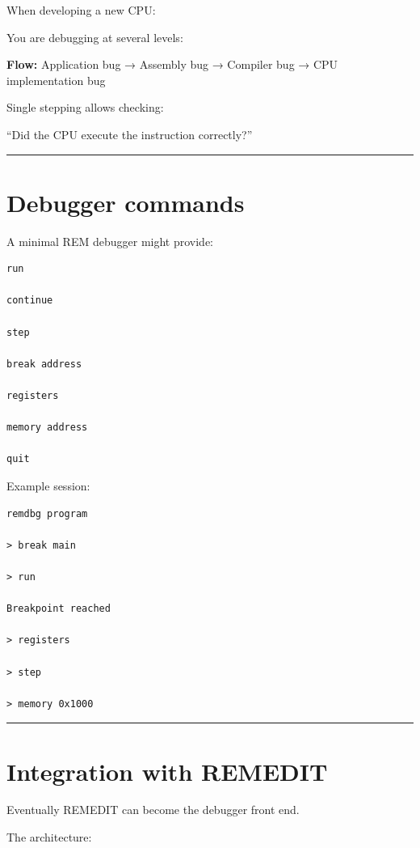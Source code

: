 \documentclass[
  oneside,
  openany]{book}
\begin{document}
When developing a new CPU:

You are debugging at several levels:

\textbf{Flow:} Application bug → Assembly bug → Compiler bug → CPU
implementation bug

Single stepping allows checking:

``Did the CPU execute the instruction correctly?''

\begin{center}\rule{0.5\linewidth}{0.5pt}\end{center}

\hypertarget{debugger-commands}{%
\section{Debugger commands}\label{debugger-commands}}

A minimal REM debugger might provide:

\begin{verbatim}
run

continue

step

break address

registers

memory address

quit
\end{verbatim}

Example session:

\begin{verbatim}
remdbg program

> break main

> run

Breakpoint reached

> registers

> step

> memory 0x1000
\end{verbatim}

\begin{center}\rule{0.5\linewidth}{0.5pt}\end{center}

\hypertarget{integration-with-remedit}{%
\section{Integration with REMEDIT}\label{integration-with-remedit}}

Eventually REMEDIT can become the debugger front end.

The architecture:
\end{document}
